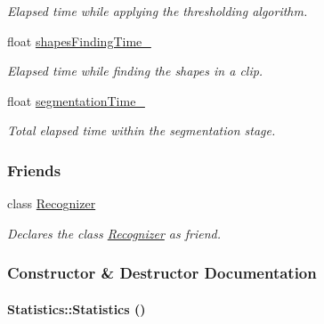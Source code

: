 \begin{CompactItemize}
\begin{CompactList}\small\item\em Elapsed time while applying the thresholding algorithm. \item\end{CompactList}\item 
\hypertarget{class_statistics_182c5f187a09c799cf37338b73ae37cd}{
float \hyperlink{class_statistics_182c5f187a09c799cf37338b73ae37cd}{shapesFindingTime\_\-}}
\label{class_statistics_182c5f187a09c799cf37338b73ae37cd}

\begin{CompactList}\small\item\em Elapsed time while finding the shapes in a clip. \item\end{CompactList}\item 
\hypertarget{class_statistics_c08594d7ee04aac7e88d62c5abe20b1f}{
float \hyperlink{class_statistics_c08594d7ee04aac7e88d62c5abe20b1f}{segmentationTime\_\-}}
\label{class_statistics_c08594d7ee04aac7e88d62c5abe20b1f}

\begin{CompactList}\small\item\em Total elapsed time within the segmentation stage. \item\end{CompactList}\end{CompactItemize}
\subsubsection*{Friends}
\begin{CompactItemize}
\item 
\hypertarget{class_statistics_11123fa51c07995419270030024a7dfe}{
class \hyperlink{class_statistics_11123fa51c07995419270030024a7dfe}{Recognizer}}
\label{class_statistics_11123fa51c07995419270030024a7dfe}

\begin{CompactList}\small\item\em Declares the class \hyperlink{class_recognizer}{Recognizer} as friend. \item\end{CompactList}\end{CompactItemize}


\subsubsection{Constructor \& Destructor Documentation}
\hypertarget{class_statistics_60ddd90a571ed4c3ce8c0f6317a36d63}{
\paragraph[Statistics]{\setlength{\rightskip}{0pt plus 5cm}Statistics::Statistics ()}\hfill}
\label{class_statistics_60ddd90a571ed4c3ce8c0f6317a36d63}


